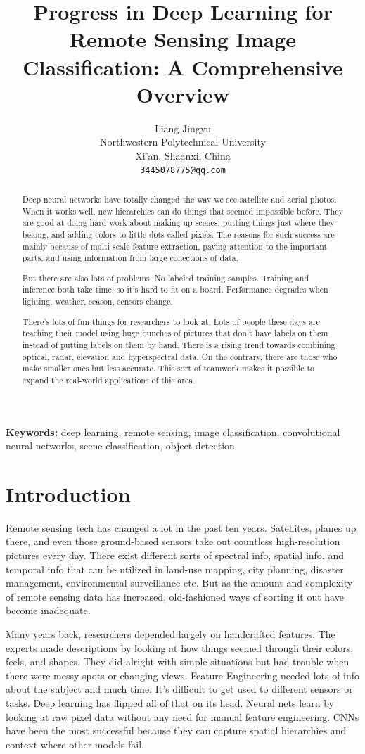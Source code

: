 \documentclass[12pt,a4paper]{article}
\title{\fontsize{14}{17}\selectfont\textbf{Progress in Deep Learning for Remote Sensing Image Classification: A Comprehensive Overview}}
\author{Liang Jingyu\\
        Northwestern Polytechnical University\\
        Xi'an, Shaanxi, China\\
        \texttt{3445078775@qq.com}}
\date{}
\begin{document}
\maketitle

\begin{abstract}
Deep neural networks have totally changed the way we see satellite and aerial photos. When it works well, new hierarchies can do things that seemed impossible before. They are good at doing hard work about making up scenes, putting things just where they belong, and adding colors to little dots called pixels. The reasons for such success are mainly because of multi-scale feature extraction, paying attention to the important parts, and using information from large collections of data.

But there are also lots of problems. No labeled training samples. Training and inference both take time, so it’s hard to fit on a board. Performance degrades when lighting, weather, season, sensors change.

There’s lots of fun things for researchers to look at. Lots of people these days are teaching their model using huge bunches of pictures that don’t have labels on them instead of putting labels on them by hand. There is a rising trend towards combining optical, radar, elevation and hyperspectral data. On the contrary, there are those who make smaller ones but less accurate. This sort of teamwork makes it possible to expand the real-world applications of this area.
\end{abstract}

\textbf{Keywords:} deep learning, remote sensing, image classification, convolutional neural networks, scene classification, object detection

\section{Introduction}
\label{sec:introduction}
Remote sensing tech has changed a lot in the past ten years. Satellites, planes up there, and even those ground-based sensors take out countless high-resolution pictures every day. There exist different sorts of spectral info, spatial info, and temporal info that can be utilized in land-use mapping, city planning, disaster management, environmental surveillance etc. But as the amount and complexity of remote sensing data has increased, old-fashioned ways of sorting it out have become inadequate.

Many years back, researchers depended largely on handcrafted features. The experts made descriptions by looking at how things seemed through their colors, feels, and shapes. They did alright with simple situations but had trouble when there were messy spots or changing views. Feature Engineering needed lots of info about the subject and much time. It’s difficult to get used to different sensors or tasks.
Deep learning has flipped all of that on its head. Neural nets learn by looking at raw pixel data without any need for manual feature engineering. CNNs have been the most successful because they can capture spatial hierarchies and context where other models fail.
\end{document}
